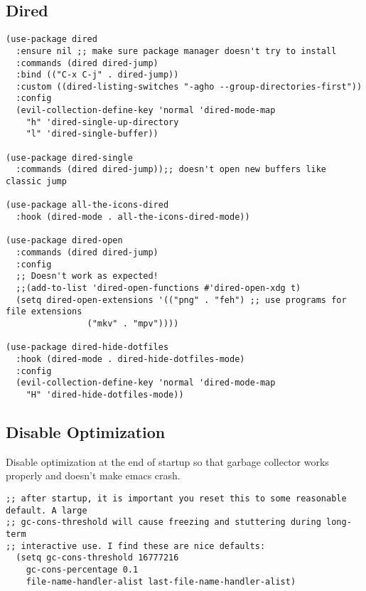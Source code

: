 \documentclass[11pt]{article}
\begin{document}
\subsection{Dired}
\label{sec:orgdc8aa8e}

\begin{verbatim}
(use-package dired
  :ensure nil ;; make sure package manager doesn't try to install
  :commands (dired dired-jump)
  :bind (("C-x C-j" . dired-jump))
  :custom ((dired-listing-switches "-agho --group-directories-first"))
  :config
  (evil-collection-define-key 'normal 'dired-mode-map
    "h" 'dired-single-up-directory
    "l" 'dired-single-buffer))

(use-package dired-single
  :commands (dired dired-jump));; doesn't open new buffers like classic jump

(use-package all-the-icons-dired
  :hook (dired-mode . all-the-icons-dired-mode))

(use-package dired-open
  :commands (dired dired-jump)
  :config
  ;; Doesn't work as expected!
  ;;(add-to-list 'dired-open-functions #'dired-open-xdg t)
  (setq dired-open-extensions '(("png" . "feh") ;; use programs for file extensions
				("mkv" . "mpv"))))

(use-package dired-hide-dotfiles
  :hook (dired-mode . dired-hide-dotfiles-mode)
  :config
  (evil-collection-define-key 'normal 'dired-mode-map
    "H" 'dired-hide-dotfiles-mode))
\end{verbatim}

\subsection{Disable Optimization}
\label{sec:orgf89bee3}
Disable optimization at the end of startup so that garbage collector works properly and doesn't make emacs crash.
\begin{verbatim}
;; after startup, it is important you reset this to some reasonable default. A large 
;; gc-cons-threshold will cause freezing and stuttering during long-term 
;; interactive use. I find these are nice defaults:
  (setq gc-cons-threshold 16777216
	gc-cons-percentage 0.1
	file-name-handler-alist last-file-name-handler-alist)
\end{verbatim}
\end{document}
